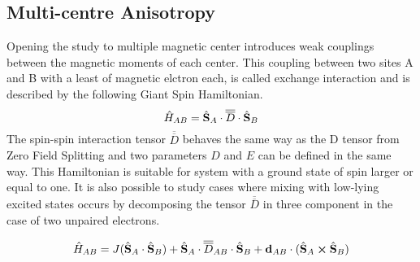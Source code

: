 \documentclass{article}
\begin{document}
\subsection{Multi-centre Anisotropy}
Opening the study to multiple magnetic center introduces weak couplings between the magnetic moments of each center. 
This coupling between two sites A and B with a least of magnetic elctron each, is called exchange interaction and is described by the following Giant Spin Hamiltonian.
\begin{equation}
    \hat{H}_{AB}=\hat{\vb S}_A\cdot \overline{\overline{D}} \cdot \hat{\vb S}_B
\end{equation}
The spin-spin interaction tensor $\overline{\overline{D}}$ behaves the same way as the D tensor from Zero Field Splitting and two parameters $D$ and $E$ can be defined in the same way. 
This Hamiltonian is suitable for system with a ground state of spin larger or equal to one.
It is also possible to study cases where mixing with low-lying excited states occurs by decomposing the tensor $\overline{\overline{D}}$ in three component in the case of two unpaired electrons.

\begin{equation}
    \hat{H}_{AB}=J(\hat{\vb S}_A \cdot \hat{\vb S}_B) + \hat{\vb S}_A \cdot\overline{\overline{D}}_{AB} \cdot \hat{\vb S}_B + \vb{d}_{AB} \cdot (\hat{\vb S}_A \cross \hat{\vb S}_B)
\end{equation}
\end{document}
